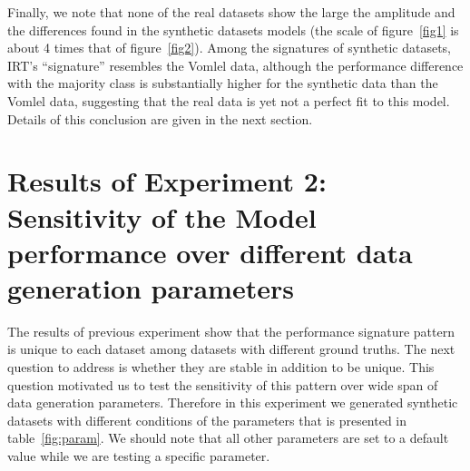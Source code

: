 
Finally, we note that none of the real datasets show the large the amplitude and the differences found in the synthetic datasets models (the scale of figure~\ref{fig1} is about 4 times that of figure~\ref{fig2}). Among the signatures of synthetic datasets, IRT's ``signature'' resembles the Vomlel data, although the performance difference with the majority class is substantially higher for the synthetic data than the Vomlel data, suggesting that the real data is yet not a perfect fit to this model. Details of this conclusion are given in the next section.

\section{Results of Experiment 2: Sensitivity of the Model performance over different data generation parameters}
\label{Sensitive}

The results of previous experiment show that the performance signature pattern is unique to each dataset among datasets with different ground truths. The next question to address is whether they are stable in addition to be unique. This question motivated us to test the sensitivity of this pattern over wide span of data generation parameters. Therefore in this experiment we generated synthetic datasets with different conditions of the parameters that is presented in table~\ref{fig:param}. We should note that all other parameters are set to a default value while we are testing a specific parameter.

